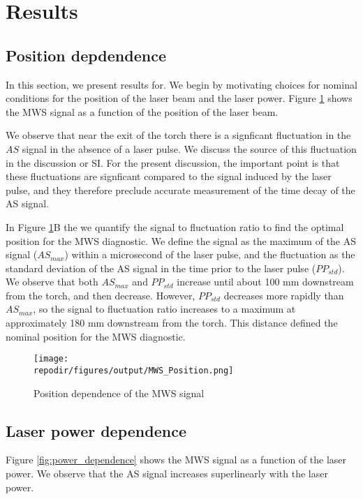 

\section{Results}

\subsection{Position depdendence}

In this section, we present results for. We begin by motivating choices for nominal conditions for the position of the laser beam and the laser power. Figure \ref{fig:pos_dependence} shows the MWS signal as a function of the position of the laser beam. 

We observe that near the exit of the torch there is a signficant fluctuation in the $AS$ signal in the absence of a laser pulse. We discuss the source of this fluctuation in the discussion or SI. For the present discussion, the important point is that these fluctuations are signficant compared to the signal induced by the laser pulse, and they therefore preclude accurate measurement of the time decay of the AS signal. 

In Figure \ref{fig:pos_dependence}B the we quantify the signal to fluctuation ratio to find the optimal position for the MWS diagnostic. We define the signal as the maximum of the AS signal ($AS_{max}$) within a microsecond of the laser pulse, and the fluctuation as the standard deviation of the AS signal in the time prior to the laser pulse ($PP_{std}$). We observe that both $AS_{max}$ and $PP_{std}$ increase until about 100 mm downstream from the torch, and then decrease. However, $PP_{std}$ decreases more rapidly than $AS_{max}$, so the signal to fluctuation ratio increases to a maximum at approximately 180 mm downstream from the torch. This distance defined the nominal position for the MWS diagnostic.


\begin{figure}[h]
    \texttt{[image: \\repodir/figures/output/MWS\_Position.png]} 
    \caption{Position dependence of the MWS signal}
    \label{fig:pos_dependence}
\end{figure}

\subsection{Laser power dependence}

Figure \ref{fig:power_dependence} shows the MWS signal as a function of the laser power. We observe that the AS signal increases superlinearly with the laser power. 

